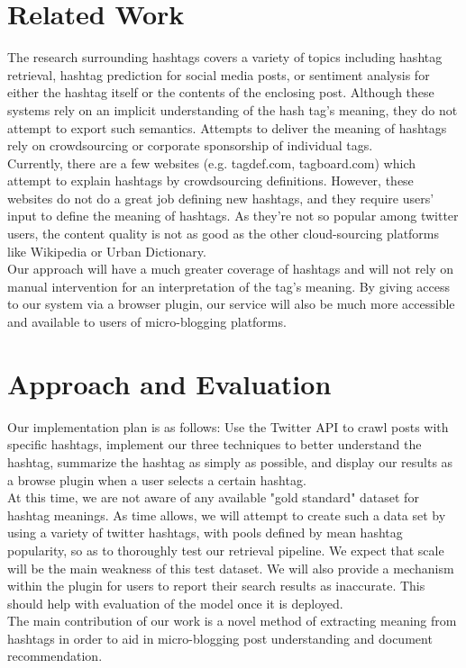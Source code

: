 \documentclass{sig-alternate}
\begin{document}
\section{Related Work}
The research surrounding hashtags covers a variety of topics including hashtag retrieval\cite{efron:retrieval}, hashtag prediction\cite{khabiri:predict}\cite{tagspace} for social media posts, or sentiment analysis for either the hashtag itself or the contents of the enclosing post.  Although these systems rely on an implicit understanding of the hash tag's meaning, they do not attempt to export such semantics.  Attempts to deliver the meaning of hashtags rely on crowdsourcing or corporate sponsorship of individual tags.\\
Currently, there are a few websites (e.g. tagdef.com, tagboard.com) which attempt to explain hashtags by crowdsourcing definitions. However, these websites do not do a great job defining new hashtags, and they require users' input to define the meaning of hashtags. As they're not so popular among twitter users, the content quality is not as good as the other cloud-sourcing platforms like Wikipedia or Urban Dictionary.\\
Our approach will have a much greater coverage of hashtags and will not rely on manual intervention for an interpretation of the tag's meaning.  By giving access to our system via a browser plugin, our service will also be much more accessible and available to users of micro-blogging platforms.\\

\section{Approach and Evaluation}
Our implementation plan is as follows: Use the Twitter API to crawl posts with specific hashtags, implement our three techniques to better understand the hashtag, summarize the hashtag as simply as possible, and display our results as a browse plugin when a user selects a certain hashtag.\\
  At this time, we are not aware of any available "gold standard" dataset for hashtag meanings.  As time allows, we will attempt to create such a data set by using a variety of twitter hashtags, with pools defined by mean hashtag popularity, so as to thoroughly test our retrieval pipeline.  We expect that scale will be the main weakness of this test dataset.  We will also provide a mechanism within the plugin for users to report their search results as inaccurate.  This should help with evaluation of the model once it is deployed.\\
The main contribution of our work is a novel method of extracting meaning from hashtags in order to aid in micro-blogging post understanding and document recommendation.\\



\end{document}

